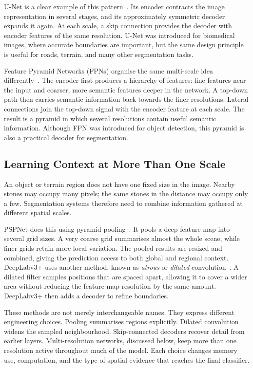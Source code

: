 U-Net is a clear example of this pattern~\cite{ronneberger2015unet}. Its encoder
contracts the image representation in several stages, and its approximately
symmetric decoder expands it again. At each scale, a skip connection provides
the decoder with encoder features of the same resolution. U-Net was introduced
for biomedical images, where accurate boundaries are important, but the same
design principle is useful for roads, terrain, and many other segmentation
tasks.

Feature Pyramid Networks (FPNs) organise the same multi-scale idea
differently~\cite{lin2017fpn}. The encoder first produces a hierarchy of
features: fine features near the input and coarser, more semantic features
deeper in the network. A top-down path then carries semantic information back
towards the finer resolutions. Lateral connections join the top-down signal
with the encoder feature at each scale. The result is a pyramid in which
several resolutions contain useful semantic information. Although FPN was
introduced for object detection, this pyramid is also a practical decoder for
segmentation.

\subsection{Learning Context at More Than One Scale}

An object or terrain region does not have one fixed size in the image. Nearby
stones may occupy many pixels; the same stones in the distance may occupy only
a few. Segmentation systems therefore need to combine information gathered at
different spatial scales.

PSPNet does this using pyramid pooling~\cite{zhao2017pspnet}. It pools a deep
feature map into several grid sizes. A very coarse grid summarises almost the
whole scene, while finer grids retain more local variation. The pooled results
are resized and combined, giving the prediction access to both global and
regional context. DeepLabv3+ uses another method, known as \emph{atrous} or
\emph{dilated} convolution~\cite{chen2018deeplab}. A dilated filter samples
positions that are spaced apart, allowing it to cover a wider area without
reducing the feature-map resolution by the same amount. DeepLabv3+ then adds a
decoder to refine boundaries.

These methods are not merely interchangeable names. They express different
engineering choices. Pooling summarises regions explicitly. Dilated
convolution widens the sampled neighbourhood. Skip-connected decoders recover
detail from earlier layers. Multi-resolution networks, discussed below, keep
more than one resolution active throughout much of the model. Each choice
changes memory use, computation, and the type of spatial evidence that reaches
the final classifier.

